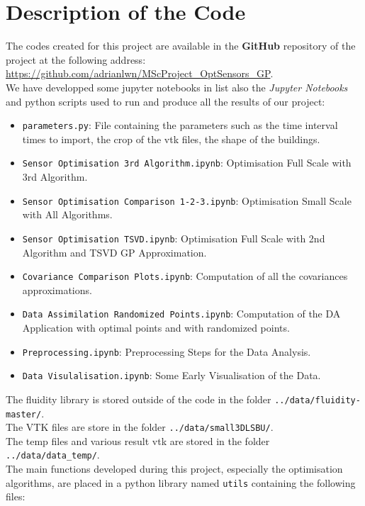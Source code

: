 \chapter{Description of the Code} \label{appendix:code}

The codes created for this project are available in the \textbf{GitHub} repository of the project at the following address: \url{https://github.com/adrianlwn/MScProject\_OptSensors\_GP}. \\


We have developped some jupyter notebooks in  list also the \textit{Jupyter Notebooks} and python scripts used  to run and produce all the results of our project:
\begin{itemize}
	\item \texttt{parameters.py}: File containing the parameters such as the time interval times to import, the crop of the vtk files, the shape of the buildings. 
	\item \texttt{Sensor Optimisation 3rd Algorithm.ipynb}: Optimisation Full Scale with 3rd Algorithm. 
	\item \texttt{Sensor Optimisation Comparison 1-2-3.ipynb}: Optimisation Small Scale with All Algorithms. 

	\item \texttt{Sensor Optimisation TSVD.ipynb}: Optimisation Full Scale with 2nd Algorithm and TSVD GP Approximation.  
	\item \texttt{Covariance Comparison Plots.ipynb}: Computation of all the covariances approximations. 
	\item \texttt{Data Assimilation Randomized Points.ipynb}: Computation of the DA Application with optimal points and with randomized points. 
	\item \texttt{Preprocessing.ipynb}: Preprocessing Steps for the Data Analysis. 
	\item \texttt{Data Visulalisation.ipynb}: Some Early Visualisation of the Data. 

\end{itemize}


The fluidity library is stored outside of the code in the folder \texttt{../data/fluidity-master/}. \\
The VTK files are store in the folder \texttt{../data/small3DLSBU/}. \\
The temp files and various result vtk are stored in the folder \texttt{../data/data\_temp/}. \\


The main functions developed during this project, especially the optimisation algorithms, are placed in a python library named \texttt{utils} containing the following files: 

